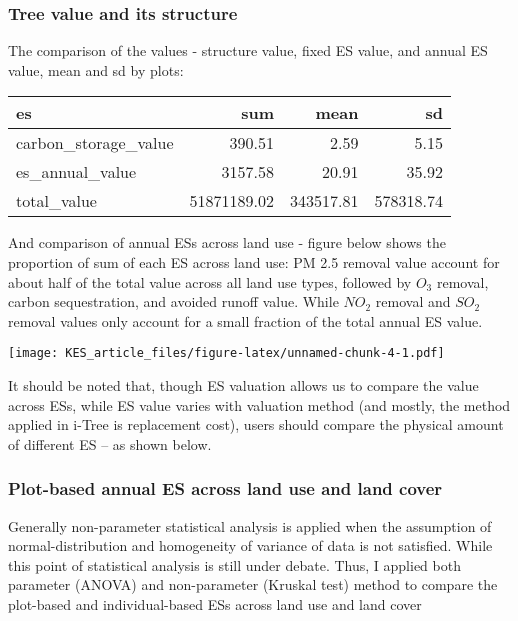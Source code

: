 \documentclass[
]{article}
\begin{document}
\hypertarget{tree-value-and-its-structure}{%
\subsubsection{Tree value and its structure}\label{tree-value-and-its-structure}}

The comparison of the values - structure value, fixed ES value, and annual ES value, mean and sd by plots:

\begin{tabular}{l|r|r|r}
\hline
es & sum & mean & sd\\
\hline
carbon\_storage\_value & 390.51 & 2.59 & 5.15\\
\hline
es\_annual\_value & 3157.58 & 20.91 & 35.92\\
\hline
total\_value & 51871189.02 & 343517.81 & 578318.74\\
\hline
\end{tabular}

And comparison of annual ESs across land use - figure below shows the proportion of sum of each ES across land use: PM 2.5 removal value account for about half of the total value across all land use types, followed by \(O_3\) removal, carbon sequestration, and avoided runoff value. While \(NO_2\) removal and \(SO_2\) removal values only account for a small fraction of the total annual ES value.

\texttt{[image: KES\_article\_files/figure-latex/unnamed-chunk-4-1.pdf]}

It should be noted that, though ES valuation allows us to compare the value across ESs, while ES value varies with valuation method (and mostly, the method applied in i-Tree is replacement cost), users should compare the physical amount of different ES -- as shown below.

\hypertarget{plot-based-annual-es-across-land-use-and-land-cover}{%
\subsubsection{Plot-based annual ES across land use and land cover}\label{plot-based-annual-es-across-land-use-and-land-cover}}

Generally non-parameter statistical analysis is applied when the assumption of normal-distribution and homogeneity of variance of data is not satisfied. While this point of statistical analysis is still under debate. Thus, I applied both parameter (ANOVA) and non-parameter (Kruskal test) method to compare the plot-based and individual-based ESs across land use and land cover
\end{document}
